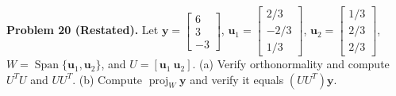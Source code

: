 \documentclass[11pt, letterpaper]{article}
\theoremstyle{definition}
\theoremstyle{remark}
\begin{document}
\textbf{Problem 20 (Restated).} Let $\mathbf{y} = \begin{bmatrix} 6 \\ 3 \\ -3 \end{bmatrix}$, $\mathbf{u}_1 = \begin{bmatrix} 2/3 \\ -2/3 \\ 1/3 \end{bmatrix}$, $\mathbf{u}_2 = \begin{bmatrix} 1/3 \\ 2/3 \\ 2/3 \end{bmatrix}$, $W = \operatorname{Span}\{\mathbf{u}_1, \mathbf{u}_2\}$, and $U = [\mathbf{u}_1 \ \mathbf{u}_2]$. (a) Verify orthonormality and compute $U^T U$ and $UU^T$. (b) Compute $\operatorname{proj}_W \mathbf{y}$ and verify it equals $(UU^T)\mathbf{y}$.
\end{document}
